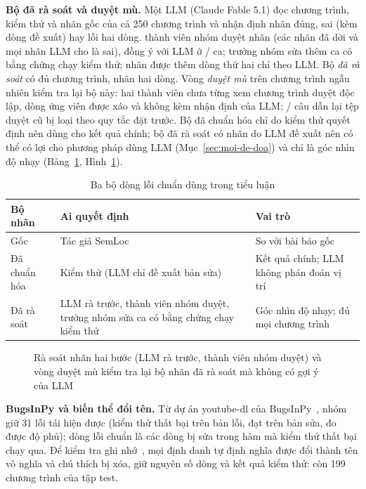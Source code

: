 \textbf{Bộ đã rà soát và duyệt mù.} Một LLM (Claude Fable 5.1) đọc chương trình, kiểm thử và nhãn gốc của cả 250
chương trình và nhận định nhãn đúng, sai (kèm dòng đề xuất) hay lỗi hai dòng. \ReviewReviewersN{} thành viên nhóm duyệt
\ReviewHumanN{} nhãn (các nhãn đã dời và mọi nhãn LLM cho là sai), đồng ý với LLM ở \ReviewAgreeN{}/\ReviewHumanN{} ca;
trưởng nhóm sửa thêm \ReviewOverrideN{} ca có bằng chứng chạy kiểm thử; \LabaudAllExtended{} nhãn được thêm dòng thứ hai
chỉ theo LLM. Bộ \emph{đã rà soát} có đủ \LabaudAllN{} chương trình, \LabaudAllTwoLine{} nhãn hai dòng. Vòng \emph{duyệt
mù} trên \BlindBlindAllPrograms{} chương trình ngẫu nhiên kiểm tra lại bộ này: hai thành viên chưa từng xem chương trình
duyệt độc lập, dòng ứng viên được xáo và không kèm nhận định của LLM; \BlindAnswersExcluded{}/\BlindAnswersTotal{} câu
dẫn lại tệp duyệt cũ bị loại theo quy tắc đặt trước. Bộ đã chuẩn hóa chỉ do kiểm thử quyết định nên dùng cho kết quả
chính; bộ đã rà soát có nhãn do LLM đề xuất nên có thể có lợi cho phương pháp dùng LLM (Mục~\ref{sec:moi-de-doa}) và
chỉ là góc nhìn độ nhạy (Bảng~\ref{tab:ba-bo-nhan}, Hình~\ref{fig:ra-soat}).

\begin{table}[H]\centering
\caption{Ba bộ dòng lỗi chuẩn dùng trong tiểu luận}\label{tab:ba-bo-nhan}
\small
\begin{tabularx}{\linewidth}{@{}l>{\raggedright\arraybackslash}X>{\raggedright\arraybackslash}X@{}}
\toprule Bộ nhãn & Ai quyết định & Vai trò \\ \midrule
Gốc & Tác giả SemLoc & So với bài báo gốc \\
Đã chuẩn hóa & Kiểm thử (LLM chỉ đề xuất bản sửa) & Kết quả chính; LLM không phán đoán vị trí \\
Đã rà soát & LLM rà trước, thành viên nhóm duyệt, trưởng nhóm sửa ca có bằng chứng chạy kiểm thử & Góc nhìn độ nhạy; đủ mọi chương trình \\
\bottomrule\end{tabularx}
\end{table}

\begin{figure}[H]\centering

\caption{Rà soát nhãn hai bước (LLM rà trước, thành viên nhóm duyệt) và vòng duyệt mù kiểm tra lại bộ nhãn đã rà soát mà không có gợi ý của LLM}\label{fig:ra-soat}
\end{figure}

\textbf{BugsInPy và biến thể đổi tên.} Từ dự án youtube-dl của BugsInPy~\cite{widyasari2020}, nhóm giữ 31 lỗi tái hiện
được (kiểm thử thất bại trên bản lỗi, đạt trên bản sửa, đo được độ phủ); dòng lỗi chuẩn là các dòng bị sửa trong hàm mà
kiểm thử thất bại chạy qua. Để kiểm tra ghi nhớ~\cite{ramos2024memorize,xu2024contam}, mọi định danh tự định nghĩa được
đổi thành tên vô nghĩa và chú thích bị xóa, giữ nguyên số dòng và kết quả kiểm thử: còn 199 chương trình của tập test.

